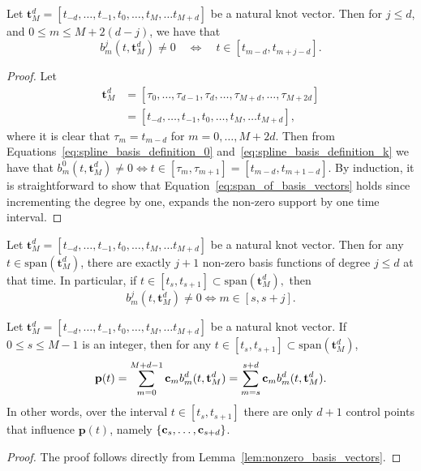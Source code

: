\begin{lemma} \label{lem:span_of_basis_vectors}
	Let $\mathbf{t}_M^d=[t_{-d}, \dots, t_{-1}, t_0, \dots, t_M, \dots t_{M+d}]$ be a natural knot vector.  Then for $j\leq d$, and $0\leq m\leq M+2(d-j)$, we have that
\begin{equation}\label{eq:span_of_basis_vectors}
b_m^j(t, \mathbf{t}_M^d) \neq 0 \quad \iff \quad t\in [t_{m-d}, t_{m+j-d}].
\end{equation}
\end{lemma}
\begin{proof}
	Let 
	\begin{align*}
		\mathbf{t}_M^d
			&=[\tau_0, \dots, \tau_{d-1}, \tau_d, \dots, \tau_{M+d}, \dots, \tau_{M+2d}] \\
			&=[t_{-d}, \dots, t_{-1}, t_0, \dots, t_M, \dots t_{M+d}],
	\end{align*}
	where it is clear that $\tau_m=t_{m-d}$ for $m=0, \dots, M+2d$.
	Then from Equations~\eqref{eq:spline_basis_definition_0} and~\eqref{eq:spline_basis_definition_k} we have that $b_m^0(t, \mathbf{t}_M^d) \neq 0 \iff t\in [\tau_{m}, \tau_{m+1}]=[t_{m-d}, t_{m+1-d}]$.  By induction, it is straightforward to show that Equation~\eqref{eq:span_of_basis_vectors} holds since incrementing the degree by one, expands the non-zero support by one time interval.
\end{proof}


\begin{corollary}\label{lem:nonzero_basis_vectors}
	Let $\mathbf{t}_M^d=[t_{-d}, \dots, t_{-1}, t_0, \dots, t_M, \dots t_{M+d}]$ be a natural knot vector.  Then for any $t\in\text{span}(\mathbf{t}_M^d)$, there are exactly $j+1$ non-zero basis functions of degree $j\leq d$ at that time.  In particular, if $t\in [t_s, t_{s+1}]\subset \text{span}(\mathbf{t}_M^d),$ then
		\[
		b_m^j(t, \mathbf{t}_M^d) \neq 0 \iff m\in[s, s+j].
		\]		
\end{corollary}

\begin{corollary}\label{lem:finite_num_control_points}
	Let $\mathbf{t}_M^d=[t_{-d}, \dots, t_{-1}, t_0, \dots, t_M, \dots t_{M+d}]$ be a natural knot vector.  
	If $0\leq s \leq M-1$ is an integer, then for any $t\in[t_s, t_{s+1}]\subset\text{span}(\mathbf{t}_M^d)$,
	\[
	\mathbf{p}(t) = \sum_{m=0}^{M+d-1} \mathbf{c}_m b_m^d(t, \mathbf{t}_M^d) 
	              = \sum_{m=s}^{s+d} \mathbf{c}_m b_m^d(t,  \mathbf{t}_M^d).
	\]
	In other words, over the interval $t\in[t_s, t_{s+1}]$ there are only $d+1$ control points that influence $\mathbf{p}(t)$, namely $\{\mathbf{c}_s, \dots, \mathbf{c}_{s+d}\}$.
\end{corollary}
\begin{proof}
The proof follows directly from Lemma~\ref{lem:nonzero_basis_vectors}.	
\end{proof}

